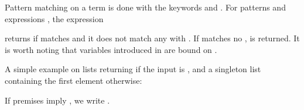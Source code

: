 \begin{isabellebody}
\begin{isamarkuptext}
Pattern matching on a term \isa{{\isasymtau}} is done with the keywords  and . For 
patterns  and expressions , the expression
\begin{quote}
 
\end{quote}
returns  if \isa{{\isasymtau}} matches  and it does not match any  with . If \isa{{\isasymtau}} matches no
,  is returned. It is worth noting that variables introduced in  are bound
on . 

A simple example on lists returning \isa{{\isacharbrackleft}{\kern0pt}{\isacharbrackright}{\kern0pt}} if the input is \isa{{\isacharbrackleft}{\kern0pt}{\isacharbrackright}{\kern0pt}}, and a
singleton list containing the first element otherwise:
\begin{quote}
\end{quote}

If premises  imply , we write \mbox{.}


\end{isamarkuptext}
\end{isabellebody}
